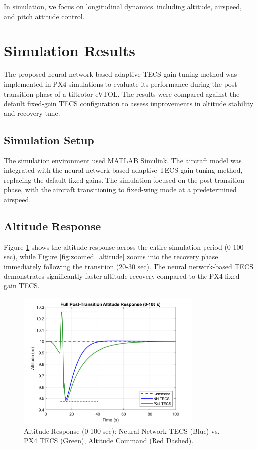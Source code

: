 \documentclass[journal,article,submit,pdftex,moreauthors]{Definitions/mdpi}
\begin{document}
In simulation, we focus on longitudinal dynamics, including altitude, airspeed, and pitch attitude control. 



\section{Simulation Results}
The proposed neural network-based adaptive TECS gain tuning method was implemented in PX4 simulations to evaluate its performance during the post-transition phase of a tiltrotor eVTOL. The results were compared against the default fixed-gain TECS configuration to assess improvements in altitude stability and recovery time.

\subsection{Simulation Setup}
The simulation environment used MATLAB Simulink. The aircraft model was integrated with the neural network-based adaptive TECS gain tuning method, replacing the default fixed gains. The simulation focused on the post-transition phase, with the aircraft transitioning to fixed-wing mode at a predetermined airspeed.

\subsection{Altitude Response}
Figure \ref{fig:full_altitude} shows the altitude response across the entire simulation period (0-100 sec), while Figure \ref{fig:zoomed_altitude} zooms into the recovery phase immediately following the transition (20-30 sec). The neural network-based TECS demonstrates significantly faster altitude recovery compared to the PX4 fixed-gain TECS.

\begin{figure}[H]
    \centering
    \includegraphics[width=0.8\textwidth]{full_altitude_plot.png}
    \caption{Altitude Response (0-100 sec): Neural Network TECS (Blue) vs. PX4 TECS (Green), Altitude Command (Red Dashed).}
    \label{fig:full_altitude}
\end{figure}
\end{document}
